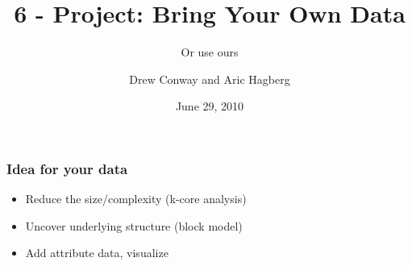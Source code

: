 \documentclass[xcolor=dvipsnames, 9pt]{beamer}
\title{6 - Project: Bring Your Own Data}
\subtitle{Or use ours}
\author{Drew Conway and Aric Hagberg}
\date{June 29, 2010}
\begin{document}
\begin{frame}[plain]
\titlepage
\end{frame}

\begin{frame}
\frametitle{Idea for your data}
    \begin{itemize}
        \item Reduce the size/complexity (k-core analysis)
        \item Uncover underlying structure (block model)
        \item Add attribute data, visualize
    \end{itemize}
\end{frame}
\end{document}
